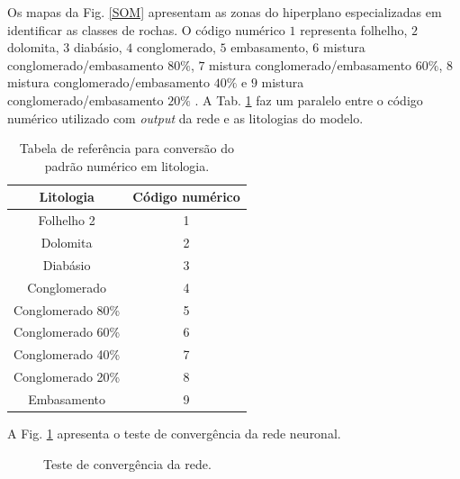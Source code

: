 Os mapas da Fig. \ref{SOM} apresentam as zonas do hiperplano especializadas em identificar as classes de rochas. O código numérico $1$ representa folhelho, $2$ dolomita, $3$ diabásio, $4$ conglomerado, $5$ embasamento, $6$ mistura conglomerado/embasamento $80\%$, $7$ mistura conglomerado/embasamento $60\%$, $8$ mistura conglomerado/embasamento $40\%$ e $9$ mistura conglomerado/embasamento $20\%$ . A Tab. \ref{codigos} faz um paralelo entre o código numérico utilizado com \textit{output} da rede e as litologias do modelo.

\begin{table}[H]
	\centering
	\begin{tabular}{c|c}
		
		Litologia                    & Código numérico \\ %
		\hline                                                             %
		Folhelho 2                 &  1\\
		Dolomita  		            &  2 \\
		Diabásio    	            &  3 \\
		Conglomerado          &  4 \\
		Conglomerado 80\% &  5  \\
		Conglomerado 60\%&  6 \\
		Conglomerado 40\%&  7\\
		Conglomerado 20\%&  8 \\
		Embasamento          &  9 \\
		
	\end{tabular}
	\label{codigos}
	\caption{Tabela de referência para conversão do padrão numérico em litologia.}
\end{table}

A Fig. \ref{convergencia} apresenta o teste de convergência da rede neuronal.

\begin{figure}[H]
	\centering
	\setlength{\fboxsep}{8pt}
	\setlength{\fboxrule}{0.1pt}
	\caption{Teste de convergência da rede.}
	\label{convergencia}
\end{figure} 


